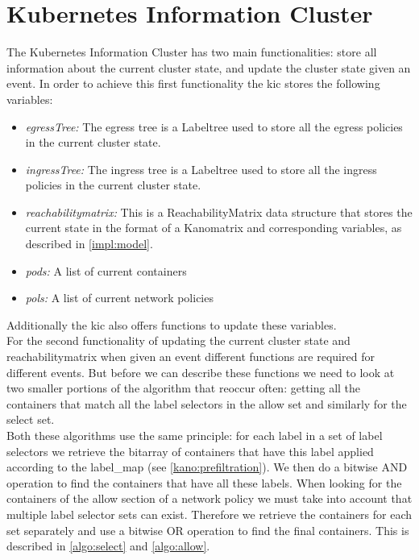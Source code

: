 \section{Kubernetes Information Cluster} \label{impl:Kic}
The Kubernetes Information Cluster has two main functionalities: store all information about the current cluster state, and update the cluster state given an event. In order to achieve this first functionality the \acrshort{kic} stores the following variables:
\begin{itemize}
    \renewcommand{\labelitemi}{\scriptsize$\blacksquare$}
    \item \textit{egressTree:} The egress tree is a Labeltree used to store all the egress policies in the current cluster state.
    \item \textit{ingressTree:} The ingress tree is a Labeltree used to store all the ingress policies in the current cluster state.
    \item \textit{reachabilitymatrix:} This is a ReachabilityMatrix data structure that stores the current state in the format of a Kanomatrix and corresponding variables, as described in \autoref{impl:model}.
    \item \textit{pods:} A list of current containers
    \item \textit{pols:} A list of current network policies
\end{itemize}
Additionally the \acrshort{kic} also offers functions to update these variables. 
\\[10pt]
For the second functionality of updating the current cluster state and reachabilitymatrix when given an event different functions are required for different events. But before we can describe these functions we need to look at two smaller portions of the algorithm that reoccur often: getting all the containers that match all the label selectors in the allow set and similarly for the select set.
\\[10pt]

Both these algorithms use the same principle: for each label in a set of label selectors we retrieve the bitarray of containers that have this label applied according to the label\_map (see \autoref{kano:prefiltration}). We then do a bitwise AND operation to find the containers that have all these labels. When looking for the containers of the allow section of a network policy we must take into account that multiple label selector sets can exist. Therefore we retrieve the containers for each set separately and use a bitwise OR operation to find the final containers. This is described in \autoref{algo:select} and \autoref{algo:allow}. 
\\[10pt]



